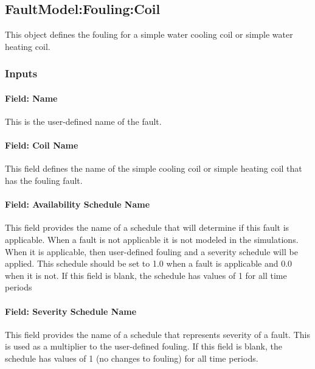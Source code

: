 \subsection{FaultModel:Fouling:Coil}\label{faultmodelfoulingcoil}

This object defines the fouling for a simple water cooling coil or simple water heating coil.

\subsubsection{Inputs}\label{inputs-5-018}

\paragraph{Field: Name}\label{field-name-5-014}

This is the user-defined name of the fault.

\paragraph{Field: Coil Name}\label{field-coil-name-001}

This field defines the name of the simple cooling coil or simple heating coil that has the fouling fault.

\paragraph{Field: Availability Schedule Name}\label{field-availability-schedule-name-5-002}

This field provides the name of a schedule that will determine if this fault is applicable. When a fault is not applicable it is not modeled in the simulations. When it is applicable, then user-defined fouling and a severity schedule will be applied. This schedule should be set to 1.0 when a fault is applicable and 0.0 when it is not. If this field is blank, the schedule has values of 1 for all time periods

\paragraph{Field: Severity Schedule Name}\label{field-severity-schedule-name-5}

This field provides the name of a schedule that represents severity of a fault. This is used as a multiplier to the user-defined fouling. If this field is blank, the schedule has values of 1 (no changes to fouling) for all time periods.

